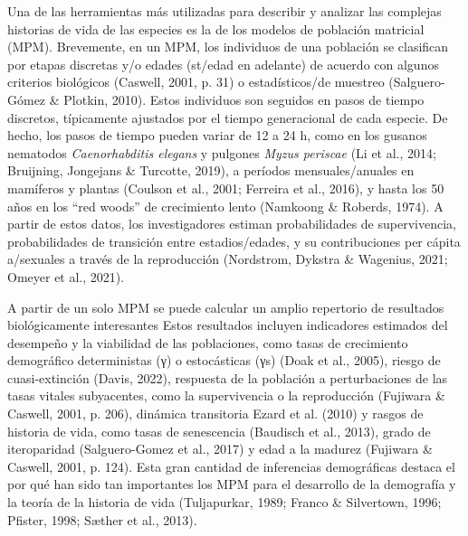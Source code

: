 \documentclass[
  12pt,
  letterpaper,
]{book}
\begin{document}
Una de las herramientas más utilizadas para describir y analizar las
complejas historias de vida de las especies es la de los modelos de
población matricial (MPM). Brevemente, en un MPM, los individuos de una
población se clasifican por etapas discretas y/o edades (st/edad en
adelante) de acuerdo con algunos criterios biológicos (Caswell, 2001, p.
31) o estadísticos/de muestreo (Salguero-Gómez \& Plotkin, 2010). Estos
individuos son seguidos en pasos de tiempo discretos, típicamente
ajustados por el tiempo generacional de cada especie. De hecho, los
pasos de tiempo pueden variar de 12 a 24 h, como en los gusanos
nematodos \emph{Caenorhabditis elegans} y pulgones \emph{Myzus periscae}
(Li et al., 2014; Bruijning, Jongejans \& Turcotte, 2019), a períodos
mensuales/anuales en mamíferos y plantas (Coulson et al., 2001; Ferreira
et al., 2016), y hasta los 50 años en los ``red woods'' de crecimiento
lento (Namkoong \& Roberds, 1974). A partir de estos datos, los
investigadores estiman probabilidades de supervivencia, probabilidades
de transición entre estadios/edades, y su contribuciones per cápita
a/sexuales a través de la reproducción (Nordstrom, Dykstra \& Wagenius,
2021; Omeyer et al., 2021).

A partir de un solo MPM se puede calcular un amplio repertorio de
resultados biológicamente interesantes Estos resultados incluyen
indicadores estimados del desempeño y la viabilidad de las poblaciones,
como tasas de crecimiento demográfico deterministas (γ) o estocásticas
(γs) (Doak et al., 2005), riesgo de cuasi-extinción (Davis, 2022),
respuesta de la población a perturbaciones de las tasas vitales
subyacentes, como la supervivencia o la reproducción (Fujiwara \&
Caswell, 2001, p. 206), dinámica transitoria Ezard et al. (2010) y
rasgos de historia de vida, como tasas de senescencia (Baudisch et al.,
2013), grado de iteroparidad (Salguero-Gomez et al., 2017) y edad a la
madurez (Fujiwara \& Caswell, 2001, p. 124). Esta gran cantidad de
inferencias demográficas destaca el por qué han sido tan importantes los
MPM para el desarrollo de la demografía y la teoría de la historia de
vida (Tuljapurkar, 1989; Franco \& Silvertown, 1996; Pfister, 1998;
Sæther et al., 2013).
\end{document}
